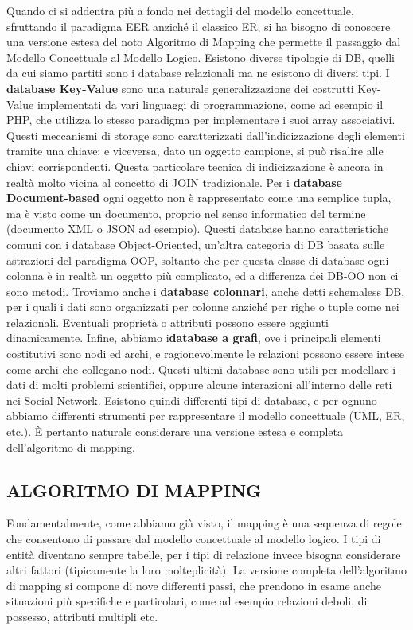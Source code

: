 Quando ci si addentra più a fondo nei dettagli del modello concettuale, sfruttando il paradigma EER anziché il classico ER, si ha bisogno di conoscere una versione estesa del noto Algoritmo di Mapping che permette il passaggio dal Modello Concettuale al Modello Logico. Esistono diverse tipologie di DB, quelli da cui siamo partiti sono i database relazionali ma ne esistono di diversi tipi. I \textbf{​database Key-Value}​ sono una naturale generalizzazione dei costrutti Key-Value implementati da vari linguaggi di programmazione, come ad esempio il PHP, che utilizza lo stesso paradigma per implementare i suoi array associativi. Questi meccanismi di storage sono caratterizzati dall'indicizzazione degli elementi tramite una chiave; e viceversa, dato un oggetto campione, si può risalire alle chiavi corrispondenti. Questa particolare tecnica di indicizzazione è ancora in realtà molto vicina al concetto di JOIN tradizionale. Per i ​\textbf{database Document-based}​ ogni oggetto non è rappresentato come una semplice tupla, ma è visto come un documento, proprio nel senso informatico del termine (documento XML o JSON ad esempio). Questi database hanno caratteristiche comuni con i database Object-Oriented, un'altra categoria di DB basata sulle astrazioni del paradigma OOP, soltanto che per questa classe di database ogni colonna è in realtà un oggetto più complicato, ed a differenza dei DB-OO non ci sono metodi. Troviamo anche i \textbf{database colonnari}​, anche detti schemaless DB, per i quali i dati sono organizzati per colonne anziché per righe o tuple come nei relazionali. Eventuali proprietà o attributi possono essere aggiunti dinamicamente. Infine, abbiamo i \textbf{​database a grafi}​, ove i principali elementi costitutivi sono nodi ed archi, e ragionevolmente le relazioni possono essere intese come archi che collegano nodi. Questi ultimi database sono utili per modellare i dati di molti problemi scientifici, oppure alcune interazioni all'interno delle reti nei Social Network. Esistono quindi differenti tipi di database, e per ognuno abbiamo differenti strumenti per rappresentare il modello concettuale (UML, ER, etc.). \`E pertanto naturale considerare una versione estesa e completa dell'algoritmo di mapping.  

\subsection{ALGORITMO DI MAPPING}
  
Fondamentalmente, come abbiamo già visto, il mapping è una sequenza di regole che consentono di passare dal modello concettuale al modello logico. I tipi di entità diventano sempre tabelle, per i tipi di relazione invece bisogna considerare altri fattori (tipicamente la loro molteplicità). La versione completa dell’algoritmo di mapping si compone di nove differenti passi, che prendono in esame anche situazioni più specifiche e particolari, come ad esempio relazioni deboli, di possesso, attributi multipli etc.  

